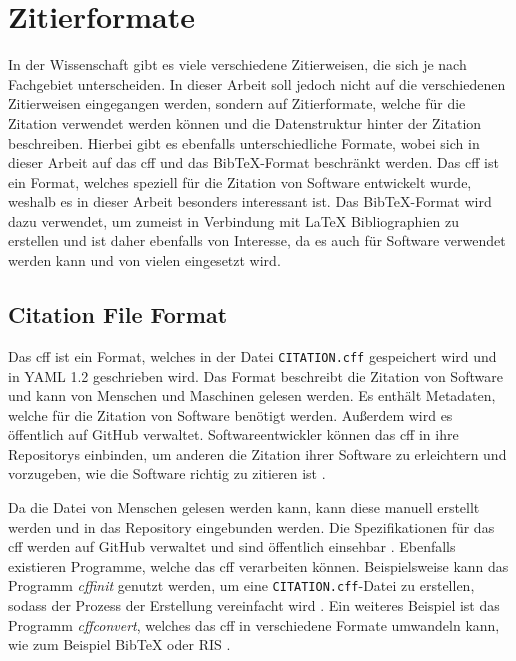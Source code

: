 \section{Zitierformate}
\label{sec:zitierformate}
In der Wissenschaft gibt es viele verschiedene Zitierweisen, die sich je nach Fachgebiet unterscheiden.
In dieser Arbeit soll jedoch nicht auf die verschiedenen Zitierweisen eingegangen werden, sondern auf Zitierformate, welche für die Zitation verwendet werden können und die Datenstruktur hinter der Zitation beschreiben.
Hierbei gibt es ebenfalls unterschiedliche Formate, wobei sich in dieser Arbeit auf das \gls{cff} und das Bib\TeX{}-Format beschränkt werden.
Das \gls{cff} ist ein Format, welches speziell für die Zitation von Software entwickelt wurde, weshalb es in dieser Arbeit besonders interessant ist.
Das Bib\TeX{}-Format wird dazu verwendet, um zumeist in Verbindung mit \LaTeX{} Bibliographien zu erstellen und ist daher ebenfalls von Interesse, da es auch für Software verwendet werden kann und von vielen eingesetzt wird.

\subsection{Citation File Format}
\label{subsec:citation-file-format}
Das \gls{cff} ist ein Format, welches in der Datei \texttt{CITATION.cff} gespeichert wird und in YAML 1.2 geschrieben wird. 
Das Format beschreibt die Zitation von Software und kann von Menschen und Maschinen gelesen werden.
Es enthält Metadaten, welche für die Zitation von Software benötigt werden.
Außerdem wird es öffentlich auf GitHub verwaltet.
Softwareentwickler können das \gls{cff} in ihre Repositorys einbinden, um anderen die Zitation ihrer Software zu erleichtern und vorzugeben, wie die Software richtig zu zitieren ist \autocite{druskat_citation_2021}.

Da die Datei von Menschen gelesen werden kann, kann diese manuell erstellt werden und in das Repository eingebunden werden.
Die Spezifikationen für das \gls{cff} werden auf GitHub verwaltet und sind öffentlich einsehbar \autocite{druskat_citation_2021}.
Ebenfalls existieren Programme, welche das \gls{cff} verarbeiten können.
Beispielsweise kann das Programm \emph{cffinit} genutzt werden, um eine \texttt{CITATION.cff}-Datei zu erstellen, sodass der Prozess der Erstellung vereinfacht wird \autocite{spaaks_cffinit_2023}.
Ein weiteres Beispiel ist das Programm \textit{cffconvert}, welches das \gls{cff} in verschiedene Formate umwandeln kann, wie zum Beispiel Bib\TeX{} oder RIS \autocite{spaaks_cffconvert_2021}.

